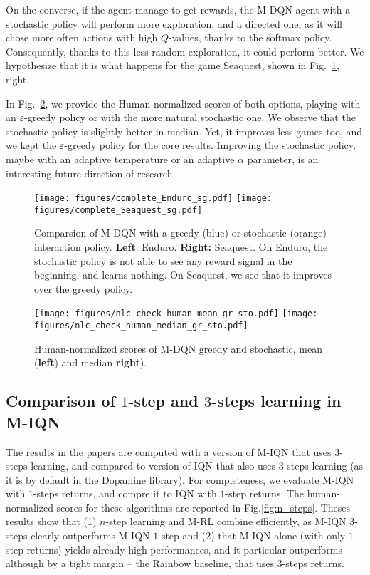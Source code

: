 \documentclass{article}
\begin{document}
On the converse, if the agent manage to get rewards, the M-DQN agent with a stochastic policy will perform more exploration, and a directed one, as it will chose more often actions with high $Q$-values, thanks to the softmax policy. Consequently, thanks to this less random exploration, it could perform better. We hypothesize that it is what happens for the game Seaquest, shown in Fig.~\ref{fig:g_sto_games}, right.

In Fig.~\ref{fig:gr_sto_human}, we provide the Human-normalized scores of both options, playing with an $\varepsilon$-greedy policy or with the more natural stochastic one. We observe that the stochastic policy is slightly better in median. Yet, it improves less games too, and we kept the $\varepsilon$-greedy policy for the core results. Improving the stochastic policy, maybe with an adaptive temperature or an adaptive $\alpha$ parameter, is an interesting future direction of research.



\begin{figure}
    \centering
    \texttt{[image: figures/complete\_Enduro\_sg.pdf]}
\texttt{[image: figures/complete\_Seaquest\_sg.pdf]}
    \caption{Comparsion of M-DQN with a greedy (blue) or stochastic (orange) interaction policy. \textbf{Left}: Enduro. \textbf{Right:} Seaquest. On Enduro, the stochastic policy is not able to see any reward signal in the beginning, and learns nothing. On Seaquest, we see that it improves over the greedy policy.}
    \label{fig:g_sto_games}
\end{figure}

\begin{figure}
    \centering
     \texttt{[image: figures/nlc\_check\_human\_mean\_gr\_sto.pdf]}
    \texttt{[image: figures/nlc\_check\_human\_median\_gr\_sto.pdf]}
    \caption{Human-normalized scores of M-DQN greedy and stochastic, mean (\textbf{left}) and median \textbf{right}).}
    \label{fig:gr_sto_human}
\end{figure}

\subsection{Comparison of $1$-step and $3$-steps learning in M-IQN}
\label{subappx:n_steps}
The results in the papers are computed with a version of M-IQN that uses $3$-steps learning, and compared to version of IQN that also uses $3$-steps learning (as it is by default in the Dopamine library). For completeness, we evaluate M-IQN with $1$-steps returns, and compre it to IQN with $1$-step returns. The human-normalized scores for these algorithms are reported in Fig.\ref{fig:n_steps}. Theses results show that (1) $n$-step learning and M-RL combine efficiently, as M-IQN $3$-steps clearly outperforms M-IQN $1$-step and (2) that M-IQN alone (with only $1$-step returns) yields already high performances, and it particular outperforms -- although by a tight margin -- the Rainbow baseline, that uses $3$-steps returns.
\end{document}
